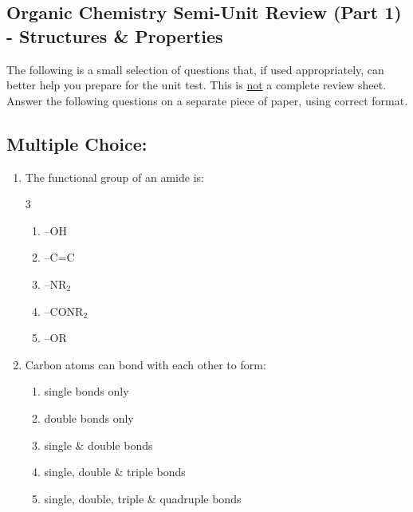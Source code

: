 \documentclass[12pt]{article}
\begin{document}
\newpage

\begin{center}
    \section*{Organic Chemistry Semi-Unit Review (Part 1) - Structures \& Properties}
\end{center}

\noindent The following is a small selection of questions that, if used appropriately, can better help you prepare for the unit test. This is \underline{not} a complete review sheet. Answer the following questions on a separate piece of paper, using correct format.

\subsection*{Multiple Choice:}
\begin{enumerate}[label=\arabic*.]
    \item The functional group of an amide is:
    \begin{multicols}{3}
    \begin{enumerate}[label=\alph*.]
        \item –OH
        \item –C=C
        \item –NR$_2$
        \item –CONR$_2$
        \item –OR
    \end{enumerate}
    \end{multicols}

    \item Carbon atoms can bond with each other to form:
    \begin{enumerate}[label=\alph*.]
        \item single bonds only
        \item double bonds only
        \item single \& double bonds
        \item single, double \& triple bonds
        \item single, double, triple \& quadruple bonds
    \end{enumerate}
\end{enumerate}
\end{document}

